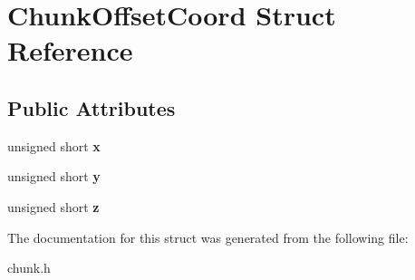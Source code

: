 \hypertarget{structChunkOffsetCoord}{\section{\-Chunk\-Offset\-Coord \-Struct \-Reference}
\label{structChunkOffsetCoord}
}
\subsection*{\-Public \-Attributes}
\begin{DoxyCompactItemize}
\item 
\hypertarget{structChunkOffsetCoord_a34b2dd60d69723ecffb9485f39376eea}{unsigned short {\bfseries x}}\label{structChunkOffsetCoord_a34b2dd60d69723ecffb9485f39376eea}

\item 
\hypertarget{structChunkOffsetCoord_ae0a82747626ffcacc8df6ef8d3cd90e7}{unsigned short {\bfseries y}}\label{structChunkOffsetCoord_ae0a82747626ffcacc8df6ef8d3cd90e7}

\item 
\hypertarget{structChunkOffsetCoord_a4044761f8368e90e3082fdb9a4e6d03c}{unsigned short {\bfseries z}}\label{structChunkOffsetCoord_a4044761f8368e90e3082fdb9a4e6d03c}

\end{DoxyCompactItemize}


\-The documentation for this struct was generated from the following file\-:\begin{DoxyCompactItemize}
\item 
chunk.\-h\end{DoxyCompactItemize}
